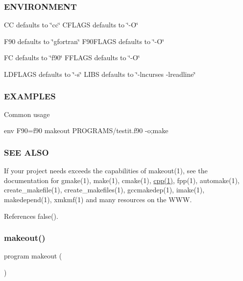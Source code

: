 \subsubsection*{E\+N\+V\+I\+R\+O\+N\+M\+E\+NT}

CC defaults to \char`\"{}cc\char`\"{} C\+F\+L\+A\+GS defaults to \char`\"{}-\/\+O\char`\"{}

F90 defaults to \char`\"{}gfortran\char`\"{} F90\+F\+L\+A\+GS defaults to \char`\"{}-\/\+O\char`\"{}

FC defaults to \char`\"{}f90\char`\"{} F\+F\+L\+A\+GS defaults to \char`\"{}-\/\+O\char`\"{}

L\+D\+F\+L\+A\+GS defaults to \char`\"{}-\/s\char`\"{} L\+I\+BS defaults to \char`\"{}-\/lncurses -\/lreadline\char`\"{} \subsubsection*{E\+X\+A\+M\+P\+L\+ES}

\begin{DoxyVerb} Common usage

     env F90=f90 makeout PROGRAMS/testit.f90 -o;make
\end{DoxyVerb}


\subsubsection*{S\+EE A\+L\+SO}

If your project needs exceeds the capabilities of makeout(1), see the documentation for gmake(1), make(1), cmake(1), \hyperlink{ufpp__overview_81_8txt_ad80405d1dd53db5cd0aa7a8cc7e457a3}{cpp(1)}, fpp(1), automake(1), create\+\_\+makefile(1), create\+\_\+makefiles(1), gccmakedep(1), imake(1), makedepend(1), xmkmf(1) and many resources on the W\+WW. 

References false().

\mbox{\label{makeout_8f90_affb61c1ee20c534b741b72ed67c9c778}} 
\subsubsection{\texorpdfstring{makeout()}{makeout()}}
{\footnotesize\ttfamily program makeout (\begin{DoxyParamCaption}{ }\end{DoxyParamCaption})}



